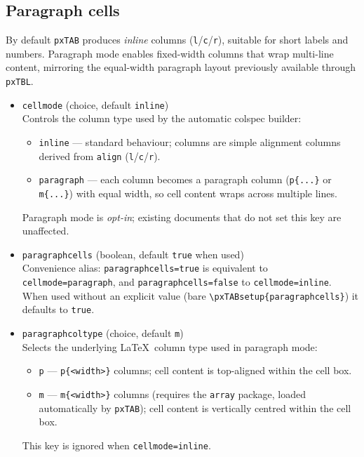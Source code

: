 \documentclass[11pt,a4paper]{article}
\begin{document}
\subsection*{Paragraph cells}

By default \texttt{pxTAB} produces \emph{inline} columns
(\texttt{l}/\texttt{c}/\texttt{r}), suitable for short labels and
numbers.  Paragraph mode enables fixed-width columns that wrap
multi-line content, mirroring the equal-width paragraph layout
previously available through \texttt{pxTBL}.

\begin{itemize}
  \item \texttt{cellmode} (choice, default \texttt{inline})\\
    Controls the column type used by the automatic colspec builder:
    \begin{itemize}
      \item \texttt{inline} --- standard behaviour;
            columns are simple alignment columns derived from
            \texttt{align} (\texttt{l}/\texttt{c}/\texttt{r}).
      \item \texttt{paragraph} --- each column becomes a paragraph
            column (\texttt{p\{...\}} or \texttt{m\{...\}}) with
            equal width, so cell content wraps across multiple lines.
    \end{itemize}
    Paragraph mode is \emph{opt-in}; existing documents that do not
    set this key are unaffected.

  \item \texttt{paragraphcells} (boolean, default \texttt{true} when used)\\
    Convenience alias:
    \texttt{paragraphcells=true} is equivalent to
    \texttt{cellmode=paragraph}, and
    \texttt{paragraphcells=false} to \texttt{cellmode=inline}.
    When used without an explicit value (bare
    \verb|\pxTABsetup{paragraphcells}|) it defaults to \texttt{true}.

  \item \texttt{paragraphcoltype} (choice, default \texttt{m})\\
    Selects the underlying \LaTeX\ column type used in paragraph mode:
    \begin{itemize}
      \item \texttt{p} --- \texttt{p\{<width>\}} columns; cell content
            is top-aligned within the cell box.
      \item \texttt{m} --- \texttt{m\{<width>\}} columns (requires the
            \texttt{array} package, loaded automatically by
            \texttt{pxTAB}); cell content is vertically centred
            within the cell box.
    \end{itemize}
    This key is ignored when \texttt{cellmode=inline}.


\end{itemize}
\end{document}
